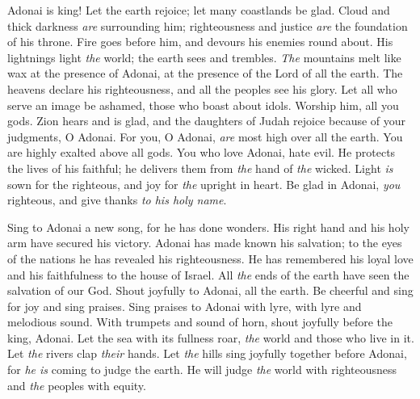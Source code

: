 \begin{biblechapter} %
 Adonai is king! Let the earth rejoice; 
let many coastlands be glad.
\verse Cloud and thick darkness \textit{are} surrounding him; 
righteousness and justice \textit{are} the foundation of his throne.
\verse Fire goes before him, 
and devours his enemies round about.
\verse His lightnings light \textit{the} world; 
the earth sees and trembles.
\verse \textit{The} mountains melt like wax at the presence of Adonai, 
at the presence of the Lord of all the earth.
\verse The heavens declare his righteousness, 
and all the peoples see his glory.
\verse Let all who serve an image be ashamed, 
those who boast about idols. 
Worship him, all you gods.
\verse Zion hears and is glad, 
and the daughters of Judah rejoice 
because of your judgments, O Adonai.
\verse For you, O Adonai, \textit{are} most high over all the earth. 
You are highly exalted above all gods.
\verse You who love Adonai, hate evil. 
He protects the lives of his faithful; 
he delivers them from \textit{the} hand of \textit{the} wicked.
\verse Light \textit{is} sown for the righteous, 
and joy for \textit{the} upright in heart.
\verse Be glad in Adonai, \textit{you} righteous, 
and give thanks \textit{to his holy name}.
\end{biblechapter}

\begin{biblechapter} %
 Sing to Adonai a new song, for he has done wonders. 
His right hand and his holy arm have secured his victory.
\verse Adonai has made known his salvation; 
to the eyes of the nations he has revealed his righteousness.
\verse He has remembered his loyal love and his faithfulness 
to the house of Israel. 
All \textit{the} ends of the earth have seen 
the salvation of our God.
\verse Shout joyfully to Adonai, all the earth. 
Be cheerful and sing for joy and sing praises.
\verse Sing praises to Adonai with lyre, 
with lyre and melodious sound.
\verse With trumpets and sound of horn, 
shout joyfully before the king, Adonai.
\verse Let the sea with its fullness roar, 
\textit{the} world and those who live in it.
\verse Let \textit{the} rivers clap \textit{their} hands. 
Let \textit{the} hills sing joyfully together
\verse before Adonai, for \textit{he is} coming 
to judge the earth. 
He will judge \textit{the} world with righteousness 
and \textit{the} peoples with equity.
\end{biblechapter}

